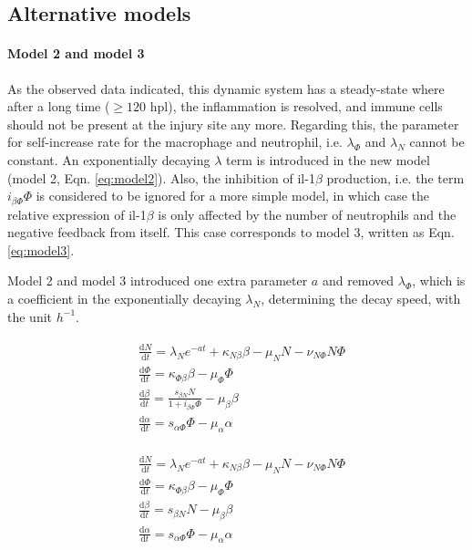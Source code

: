\subsection{Alternative models}

\paragraph{Model 2 and model 3}

As the observed data indicated, this dynamic system has a steady-state where after a long time ($\geq 120$ hpl), the inflammation is resolved, and immune cells should not be present at the injury site any more. Regarding this, the parameter for self-increase rate for the macrophage and neutrophil, i.e. $\lambda_\Phi$ and $\lambda_N$  cannot be constant. An exponentially decaying $\lambda$ term is introduced in the new model (model 2, Eqn. \ref{eq:model2}). Also, the inhibition of il-1$\beta$ production, i.e. the term $i_{\beta\Phi}\Phi$ is considered to be ignored for a more simple model, in which case the relative expression of il-1$\beta$ is only affected by the number of neutrophils and the negative feedback from itself. This case corresponds to model 3, written as Eqn. \ref{eq:model3}.

Model 2 and model 3 introduced one extra parameter $a$ and removed $\lambda_\Phi$, which is a coefficient in the exponentially decaying $\lambda_N$, determining the decay speed, with the unit $h^{-1}$.

\begin{align}
    \label{eq:model2}
    \begin{split}
        &\frac{\mathrm{d} N}{\mathrm{d} t}=\lambda_Ne^{-at}+\kappa_{N\beta}\beta-\mu_NN-\nu_{N\Phi}N\Phi\\
        &\frac{\mathrm{d} \Phi}{\mathrm{d} t}=\kappa_{\Phi\beta}\beta-\mu_\Phi\Phi\\
        &\frac{\mathrm{d} \beta}{\mathrm{d} t}=\frac{s_{\beta N}N}{1+i_{\beta\Phi}\Phi}-\mu_\beta\beta\\
        &\frac{\mathrm{d} \alpha}{\mathrm{d} t}=s_{\alpha\Phi}\Phi-\mu_\alpha\alpha
    \end{split}
\end{align}

\begin{align}
    \label{eq:model3}
    \begin{split}
        &\frac{\mathrm{d} N}{\mathrm{d} t}=\lambda_Ne^{-at}+\kappa_{N\beta}\beta-\mu_NN-\nu_{N\Phi}N\Phi\\
        &\frac{\mathrm{d} \Phi}{\mathrm{d} t}=\kappa_{\Phi\beta}\beta-\mu_\Phi\Phi\\
        &\frac{\mathrm{d} \beta}{\mathrm{d} t}=s_{\beta N}N-\mu_\beta\beta\\
        &\frac{\mathrm{d} \alpha}{\mathrm{d} t}=s_{\alpha\Phi}\Phi-\mu_\alpha\alpha
    \end{split}
\end{align}

